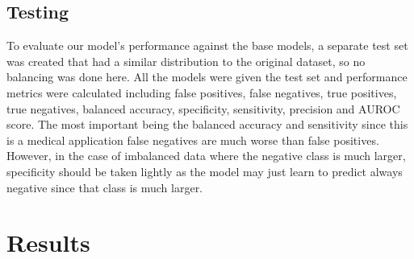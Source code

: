 \documentclass[conference]{IEEEtran}
\begin{document}
\subsection{Testing}
To evaluate our model’s performance against the base models, a separate test
set was created that had a similar distribution to the original dataset, so no
balancing was done here. All the models were given the test set and performance
metrics were calculated including false positives, false negatives, true
positives, true negatives, balanced accuracy, specificity, sensitivity,
precision and AUROC score. The most important being the balanced accuracy and
sensitivity since this is a medical application false negatives are much worse
than false positives. However, in the case of imbalanced data where the
negative class is much larger, specificity should be taken lightly as the model
may just learn to predict always negative since that class is much larger.


\section{Results}
\end{document}
